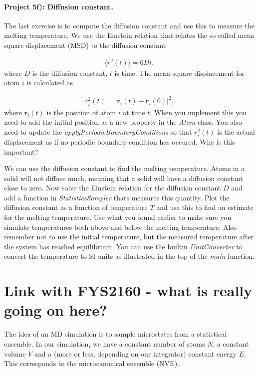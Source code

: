 \documentclass[%
oneside,                 %
final,                   %
10pt]{article}
\begin{document}
\paragraph{Project 5f): Diffusion constant.}
The last exercise is to compute the diffusion constant and use this to measure the melting temperature. We use the Einstein relation that relates the so called mean square displacement (MSD) to the diffusion constant

\begin{align}
	\langle r^2(t) \rangle = 6Dt,
\end{align}
where $D$ is the diffusion constant, $t$ is time. The mean square displacement for atom $i$ is calculated as

\begin{align}
	r_i^2(t) = |\mathbf{r}_i(t) - \mathbf{r}_i(0)|^2,
\end{align}
where $\mathbf{r}_i(t)$ is the position of atom $i$ at time $t$. When you implement this you need to add the initial position as a new property in the \emph{Atom} class. You also need to update the \emph{applyPeriodicBoundaryConditions} so that $r_i^2(t)$ is the actual displacement as if no periodic boundary condition has occured. Why is this important?

We can use the diffusion constant to find the melting temperature. Atoms in a solid will not diffuse much, meaning that a solid will have a diffusion constant close to zero. Now solve the Einstein relation for the diffusion constant $D$ and add a function in \emph{StatisticsSampler} thats measures this quantity. Plot the diffusion constant as a function of temperature $T$ and use this to find an estimate for the melting temperature. Use what you found earlier  to make sure you simulate temperatures both above and below the melting temperature. Also remember not to use the initial temperature, but the measured temperature after the system has reached equilibrium. You can use the builtin \emph{UnitConverter} to convert the temperature to SI units as illustrated in the top of the \emph{main} function. 


\section{Link with FYS2160 - what is really going on here?}
The idea of an MD simulation is to sample microstates from a statistical ensemble. In our simulation, we have a constant number of atoms $N$, a constant volume $V$ and a (more or less, depending on our integrator) constant energy $E$. This corresponds to the microcanonical ensemble (NVE). 
\end{document}
